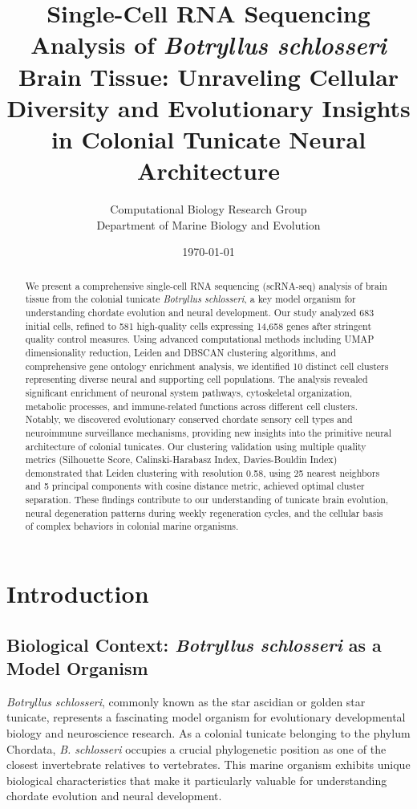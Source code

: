 \documentclass[12pt,a4paper]{article}
\title{\textbf{Single-Cell RNA Sequencing Analysis of \textit{Botryllus schlosseri} Brain Tissue: Unraveling Cellular Diversity and Evolutionary Insights in Colonial Tunicate Neural Architecture}}
\author{
Computational Biology Research Group\\
Department of Marine Biology and Evolution\\
}
\date{\today}
\begin{document}
\maketitle

\begin{abstract}
We present a comprehensive single-cell RNA sequencing (scRNA-seq) analysis of brain tissue from the colonial tunicate \textit{Botryllus schlosseri}, a key model organism for understanding chordate evolution and neural development. Our study analyzed 683 initial cells, refined to 581 high-quality cells expressing 14,658 genes after stringent quality control measures. Using advanced computational methods including UMAP dimensionality reduction, Leiden and DBSCAN clustering algorithms, and comprehensive gene ontology enrichment analysis, we identified 10 distinct cell clusters representing diverse neural and supporting cell populations. The analysis revealed significant enrichment of neuronal system pathways, cytoskeletal organization, metabolic processes, and immune-related functions across different cell clusters. Notably, we discovered evolutionary conserved chordate sensory cell types and neuroimmune surveillance mechanisms, providing new insights into the primitive neural architecture of colonial tunicates. Our clustering validation using multiple quality metrics (Silhouette Score, Calinski-Harabasz Index, Davies-Bouldin Index) demonstrated that Leiden clustering with resolution 0.58, using 25 nearest neighbors and 5 principal components with cosine distance metric, achieved optimal cluster separation. These findings contribute to our understanding of tunicate brain evolution, neural degeneration patterns during weekly regeneration cycles, and the cellular basis of complex behaviors in colonial marine organisms.
\end{abstract}

\section{Introduction}

\subsection{Biological Context: \textit{Botryllus schlosseri} as a Model Organism}

\textit{Botryllus schlosseri}, commonly known as the star ascidian or golden star tunicate, represents a fascinating model organism for evolutionary developmental biology and neuroscience research. As a colonial tunicate belonging to the phylum Chordata, \textit{B. schlosseri} occupies a crucial phylogenetic position as one of the closest invertebrate relatives to vertebrates. This marine organism exhibits unique biological characteristics that make it particularly valuable for understanding chordate evolution and neural development.
\end{document}
